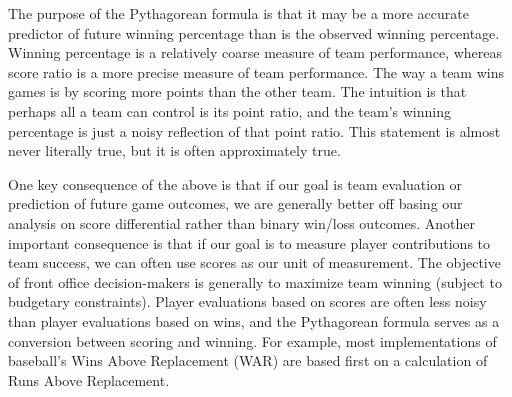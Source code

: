 \documentclass{article}
\begin{document}
The purpose of the Pythagorean formula is that it may be a more accurate predictor of future winning percentage than is the observed winning percentage. Winning percentage is a relatively coarse measure of team performance, whereas score ratio is a more precise measure of team performance. The way a team wins games is by scoring more points than the other team. The intuition is that perhaps all a team can control is its point ratio, and the team's winning percentage is just a noisy reflection of that point ratio. This statement is almost never literally true, but it is often approximately true.

One key consequence of the above is that if our goal is team evaluation or prediction of future game outcomes, we are generally better off basing our analysis on score differential rather than binary win/loss outcomes. Another important consequence is that if our goal is to measure player contributions to team success, we can often use scores as our unit of measurement. The objective of front office decision-makers is generally to maximize team winning (subject to budgetary constraints). Player evaluations based on scores are often less noisy than player evaluations based on wins, and the Pythagorean formula serves as a conversion between scoring and winning. For example, most implementations of baseball's Wins Above Replacement (WAR) are based first on a calculation of Runs Above Replacement.
\end{document}

